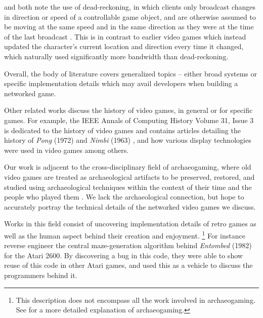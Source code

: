 \citet{Das1997NetEffect} and \citet{Blau1992NetworkedEnvironments} both note the use of dead-reckoning, in which clients only broadcast changes in direction or speed of a controllable game object, and are otherwise assumed to be moving at the same speed and in the same direction as they were at the time of the last broadcast \cite{Blau1992NetworkedEnvironments}. This is in contrast to earlier video games which instead updated the character's current location and direction every time it changed, which naturally used significantly more bandwidth than dead-reckoning.

Overall, the body of literature covers generalized topics -- either broad systems or specific implementation details which may avail developers when building a networked game.

Other related works discuss the history of video games, in general or for specific games. For example, the IEEE Annals of Computing History Volume 31, Issue 3 is dedicated to the history of video games and contains articles detailing the history of \textit{Pong} (1972) \cite{lowood} and \textit{Nimbi} (1963) \cite{jorgensen}, and how various display technologies were used in video games \cite{bogost} among others.

Our work is adjacent to the cross-disciplinary field of archaeogaming, where old video games are treated as archaeological artifacts to be preserved, restored, and studied using archaeological techniques within the context of their time and the people who played them \cite{aycock}. We lack the archaeological connection, but hope to accurately portray the technical details of the networked video games we discuss.

Works in this field consist of uncovering implementation details of retro games as well as the human aspect behind their creation and enjoyment.
\footnote{This description does not encompass all the work involved in archaeogaming. See \cite{aycock} for a more detailed explanation of archaeogaming.}
For instance \citet{Aycock2018} reverse engineer the central maze-generation algorithm behind \textit{Entombed} (1982) for the Atari 2600. By discovering a bug in this code, they were able to show reuse of this code in other Atari games, and used this as a vehicle to discuss the programmers behind it.